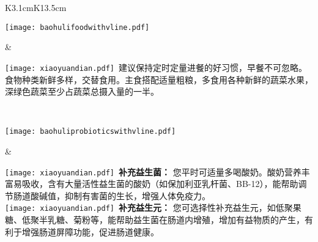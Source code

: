 \setlength{\arrayrulewidth}{.5pt}
\vspace*{-2mm}
\begin{center}
\begin{tabular}{K{3.1cm}K{13.5cm}}
\hline

\parbox[c][3cm]{.95\hsize}{
\noindent
\texttt{[image: baohulifoodwithvline.pdf]}
}
 &
\parbox{\hsize}{
\vspace*{0.5mm}
\begin{spacing}{1.5}
\fontsize{10pt}{10pt}
{\texttt{[image: xiaoyuandian.pdf]}\fontsize{9pt}{10pt}\selectfont \ 建议保持定时定量进餐的好习惯，早餐不可忽略。食物种类新鲜多样，交替食用。主食搭配适量粗粮，多食用各种新鲜的蔬菜水果，深绿色蔬菜至少占蔬菜总摄入量的一半。}
\end{spacing}
} \\
\hline

\parbox[c][4.5cm]{.95\hsize}{
\noindent
\texttt{[image: baohuliprobioticswithvline.pdf]}
}
 &
\parbox{\hsize}{
\vspace*{0.5mm}
\begin{spacing}{1.5}
\fontsize{10pt}{10pt}
{\texttt{[image: xiaoyuandian.pdf]}\fontsize{9pt}{10pt}\selectfont \ {\bf {补充益生菌：}} 您平时可适量多喝酸奶。酸奶营养丰富易吸收，含有大量活性益生菌的酸奶（如保加利亚乳杆菌、BB-12），能帮助调节肠道酸碱值，抑制有害菌的生长，增强人体免疫力。 \\}
{\texttt{[image: xiaoyuandian.pdf]}\fontsize{9pt}{10pt}\selectfont \ {\bf {补充益生元：}} 您可选择性补充益生元，如低聚果糖、低聚半乳糖、菊粉等，能帮助益生菌在肠道内增殖，增加有益物质的产生，有利于增强肠道屏障功能，促进肠道健康。}
\end{spacing}
} \\
\hline

\end{tabular}
\end{center}




